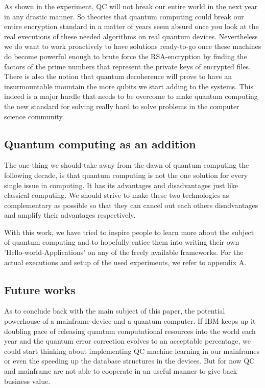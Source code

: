 As shown in the experiment, QC will not break our entire world in the next year in any drastic manner. So theories that quantum computing could break our entire encryption standard in a matter of years seem absurd once you look at the real executions of these needed algorithms on real quantum devices.
Nevertheless we do want to work proactively to have solutions ready-to-go once these machines do become powerful enough to brute force the RSA-encryption by finding the factors of the prime numbers that represent the private keys of encrypted files.
There is also the notion that quantum decoherence will prove to have an insurmountable mountain the more qubits we start adding to the systems. This indeed is a major hurdle that needs to be overcome to make quantum computing the new standard for solving really hard to solve problems in the computer science community.

\subsection{Quantum computing as an addition}

The one thing we should take away from the dawn of quantum computing the following decade, is that quantum computing is not the one solution for every single issue in computing. It has its advantages and disadvantages just like classical computing. We should strive to make these two technologies as complementary as possible so that they can cancel out each others disadvantages and amplify their advantages respectively. 

With this work, we have tried to inspire people to learn more about the subject of quantum computing and to hopefully entice them into writing their own 'Hello-world-Applications' on any of the freely available frameworks. For the actual executions and setup of the used experiments, we refer to appendix A.

\subsection{Future works}

As to conclude back with the main subject of this paper, the potential powerhouse of a mainframe device and a quantum computer. If IBM keeps up it doubling pace of releasing quantum computational resources into the world each year and the quantum error correction evolves to an acceptable percentage, we could start thinking about implementing QC machine learning in our mainframes or even the speeding up the database structures in the devices. But for now QC and mainframe are not able to cooperate in an useful manner to give back business value. 

